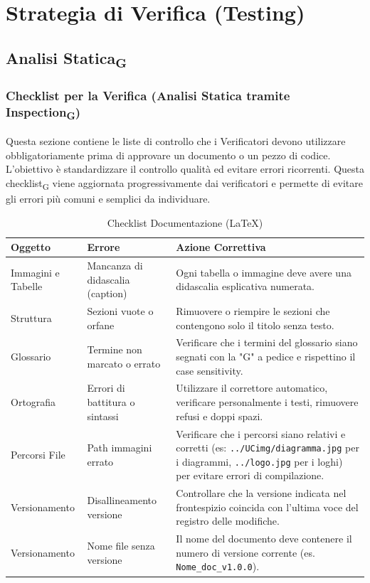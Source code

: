 \documentclass[11pt,a4paper]{article}
\begin{document}
\newpage
\section{Strategia di Verifica (Testing)}
\subsection{Analisi Statica\textsubscript{G}}

\subsubsection{Checklist per la Verifica (Analisi Statica tramite Inspection\textsubscript{G})}
Questa sezione contiene le liste di controllo che i Verificatori devono utilizzare obbligatoriamente prima di approvare un documento o un pezzo di codice. L'obiettivo è standardizzare il controllo qualità ed evitare errori ricorrenti.
Questa checklist\textsubscript{G} viene aggiornata progressivamente dai verificatori e permette di evitare gli errori più comuni e semplici da individuare.

\begin{table}[H]
    \centering
    \renewcommand{\arraystretch}{1.4}
    \begin{tabular}{|l|>{\raggedright\arraybackslash}p{}|>{\raggedright\arraybackslash}p{}|}
        \hline
        \textbf{Oggetto} & \textbf{Errore} & \textbf{Azione Correttiva} \\
        \hline
        Immagini e Tabelle & Mancanza di didascalia (caption) & Ogni tabella o immagine deve avere una didascalia esplicativa numerata. \\
        \hline
        Struttura & Sezioni vuote o orfane & Rimuovere o riempire le sezioni che contengono solo il titolo senza testo. \\
        \hline
        Glossario & Termine non marcato o errato & Verificare che i termini del glossario siano segnati con la "G" a pedice e rispettino il case sensitivity. \\
        \hline
        Ortografia & Errori di battitura o sintassi & Utilizzare il correttore automatico, verificare personalmente i testi, rimuovere refusi e doppi spazi. \\
        \hline
        Percorsi File & Path immagini errato & Verificare che i percorsi siano relativi e corretti (es: \texttt{../UCimg/diagramma.jpg} per i diagrammi, \texttt{../logo.jpg} per i loghi) per evitare errori di compilazione.\\
        \hline
        Versionamento & Disallineamento versione & Controllare che la versione indicata nel frontespizio coincida con l'ultima voce del registro delle modifiche. \\
        \hline
        Versionamento & Nome file senza versione & Il nome del documento deve contenere il numero di versione corrente (es. \texttt{Nome\_doc\_v1.0.0}). \\
        \hline
    \end{tabular}
    \caption{Checklist Documentazione (LaTeX)}
\end{table}
\end{document}
